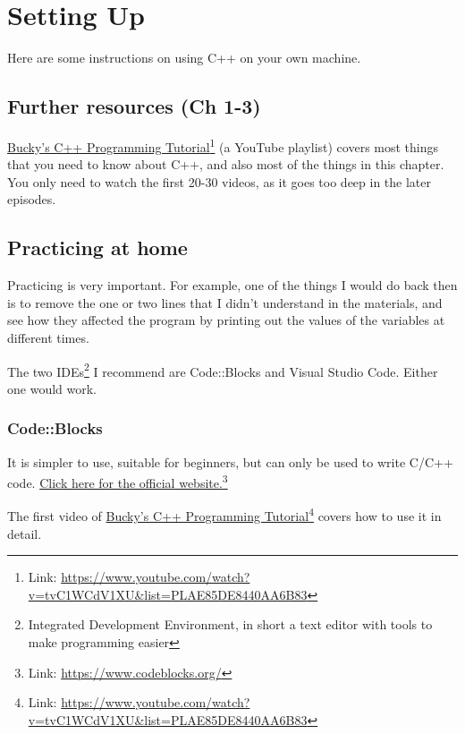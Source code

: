 \chapter{Setting Up}

Here are some instructions on using C++ on your own machine.

\section{Further resources (Ch 1-3)}
\href{https://www.youtube.com/watch?v=tvC1WCdV1XU&list=PLAE85DE8440AA6B83}{Bucky's C++ Programming Tutorial}\footnote{Link: \href{https://www.youtube.com/watch?v=tvC1WCdV1XU&list=PLAE85DE8440AA6B83}{https://www.youtube.com/watch?v=tvC1WCdV1XU\&list=PLAE85DE8440AA6B83}} (a YouTube playlist) covers most things that you need to know about C++, and also most of the things in this chapter. You only need to watch the first 20-30 videos, as it goes too deep in the later episodes.

\section{Practicing at home}
Practicing is very important. For example, one of the things I would do back then is to remove the one or two lines that I didn't understand in the materials, and see how they affected the program by printing out the values of the variables at different times. 

The two IDEs\footnote{Integrated Development Environment, in short a text editor with tools to make programming easier} I recommend are Code::Blocks and Visual Studio Code. Either one would work.

\subsection*{Code::Blocks}

It is simpler to use, suitable for beginners, but can only be used to write C/C++ code. \href{https://www.codeblocks.org/}{Click here for the official website.}\footnote{Link: \href{https://www.codeblocks.org/}{https://www.codeblocks.org/}}

The first video of \href{https://www.youtube.com/watch?v=tvC1WCdV1XU&list=PLAE85DE8440AA6B83}{Bucky's C++ Programming Tutorial}\footnote{Link: \href{https://www.youtube.com/watch?v=tvC1WCdV1XU&list=PLAE85DE8440AA6B83}{https://www.youtube.com/watch?v=tvC1WCdV1XU\&list=PLAE85DE8440AA6B83}} covers how to use it in detail.

